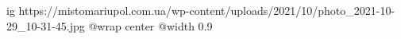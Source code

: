  
 
 
 
 

\ifcmt
  ig https://mistomariupol.com.ua/wp-content/uploads/2021/10/photo_2021-10-29_10-31-45.jpg
  @wrap center
  @width 0.9
\fi
